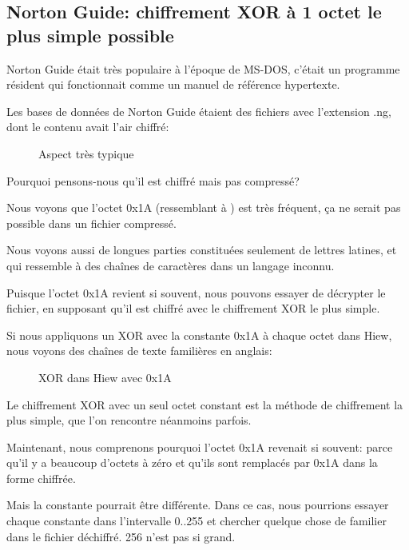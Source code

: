 \clearpage
\subsection{Norton Guide: chiffrement XOR à 1 octet le plus simple possible}
\label{norton_guide}

Norton Guide était très
populaire à l'époque de MS-DOS, c'était un programme résident qui fonctionnait comme
un manuel de référence hypertexte.

Les bases de données de Norton Guide étaient des fichiers avec l'extension .ng, dont
le contenu avait l'air chiffré:

\begin{figure}[H]
\centering
{}
\caption{Aspect très typique}
\end{figure}

Pourquoi pensons-nous qu'il est chiffré mais pas compressé?

Nous voyons que l'octet 0x1A (ressemblant à \q{$\rightarrow$}) est très fréquent,
ça ne serait pas possible dans un fichier compressé.

Nous voyons aussi de longues parties constituées seulement de lettres latines, et
qui ressemble à des chaînes de caractères dans un langage inconnu.

\clearpage
Puisque l'octet 0x1A revient si souvent, nous pouvons essayer de décrypter le fichier,
en supposant qu'il est chiffré avec le chiffrement XOR le plus simple.

Si nous appliquons un XOR avec la constante 0x1A à chaque octet dans Hiew, nous voyons
des chaînes de texte familières en anglais:

\begin{figure}[H]
\centering
{}
\caption{XOR dans Hiew avec 0x1A}
\end{figure}

Le chiffrement XOR avec un seul octet constant est la méthode de chiffrement la plus
simple, que l'on rencontre néanmoins parfois.

Maintenant, nous comprenons pourquoi l'octet 0x1A revenait si souvent: parce qu'il
y a beaucoup d'octets à zéro et qu'ils sont remplacés par 0x1A dans la forme chiffrée.

Mais la constante pourrait être différente.
Dans ce cas, nous pourrions essayer chaque constante dans l'intervalle 0..255 et
chercher quelque chose de familier dans le fichier déchiffré. 256 n'est pas si grand.

